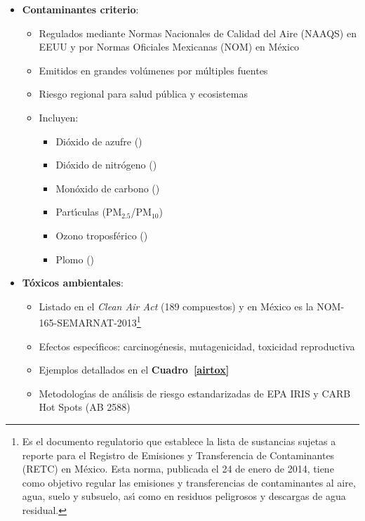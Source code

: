 \begin{itemize}
    \item \textbf{Contaminantes criterio}: 
    \begin{itemize}
        \item Regulados mediante Normas Nacionales de Calidad del Aire (NAAQS) en EEUU y por Normas Oficiales Mexicanas (NOM) en M\'exico
        \item Emitidos en grandes vol\'umenes por m\'ultiples fuentes
        \item Riesgo regional para salud p\'ublica y ecosistemas
        \item Incluyen: 
        \begin{itemize}
            \item Di\'oxido de azufre ()
            \item Di\'oxido de nitr\'ogeno ()
            \item Mon\'oxido de carbono ()
            \item Part\'{\i}culas (PM$_{2.5}$/PM$_{10}$)
            \item Ozono troposf\'erico ()
            \item Plomo ()
        \end{itemize}
    \end{itemize}
    
    \item \textbf{T\'oxicos ambientales}:
    \begin{itemize}
        \item Listado en el \emph{Clean Air Act} (189 compuestos) y en M\'exico es la  NOM-165-SEMARNAT-2013\footnote{Es el documento regulatorio que establece la lista de sustancias sujetas a reporte para el Registro de Emisiones y Transferencia de Contaminantes (RETC) en M\'exico. Esta norma, publicada el 24 de enero de 2014, tiene como objetivo regular las emisiones y transferencias de contaminantes al aire, agua, suelo y subsuelo, as\'{\i} como en residuos peligrosos y descargas de agua residual.}
        \item Efectos espec\'{\i}ficos: carcinog\'enesis, mutagenicidad, toxicidad reproductiva
        \item Ejemplos detallados en el \textbf{Cuadro~\ref{airtox}}
        \item Metodolog\'{\i}as de an\'alisis de riesgo estandarizadas de EPA IRIS y  CARB Hot Spots (AB 2588)
    \end{itemize}
\end{itemize}

